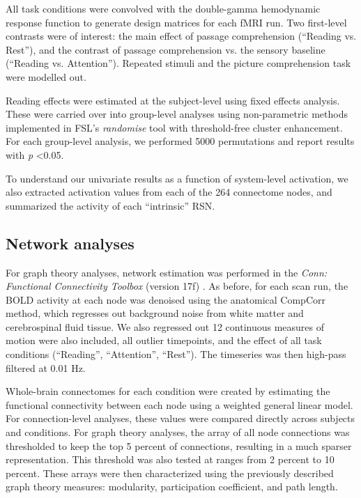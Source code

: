 All task conditions were convolved with the double-gamma hemodynamic response function to generate design matrices for each fMRI run. Two first-level contrasts were of interest: the main effect of passage comprehension (``Reading vs. Rest''), and the contrast of passage comprehension vs. the sensory baseline (``Reading vs. Attention''). Repeated stimuli and the picture comprehension task were modelled out.

Reading effects were estimated at the subject-level using fixed effects analysis. These were carried over into group-level analyses using non-parametric methods implemented in FSL’s \textit{randomise} tool with threshold-free cluster enhancement. For each group-level analysis, we performed 5000 permutations and report results with \textit{p} \textless 0.05. 

To understand our univariate results as a function of system-level activation, we also extracted activation values from each of the 264 connectome nodes, and summarized the activity of each ``intrinsic'' RSN.

\subsection{Network analyses}

For graph theory analyses, network estimation was performed in the \textit{Conn: Functional Connectivity Toolbox} (version 17f) \citep{WhitfieldGabrieli2012}. As before, for each scan run, the BOLD activity at each node was denoised using the anatomical CompCorr method, which regresses out background noise from white matter and cerebrospinal fluid tissue. We also regressed out 12 continuous measures of motion were also included, all outlier timepoints, and the effect of all task conditions (``Reading'', ``Attention'', ``Rest''). The timeseries was then high-pass filtered at 0.01 Hz.

Whole-brain connectomes for each condition were created by estimating the functional connectivity between each node using a weighted general linear model. For connection-level analyses, these values were compared directly across subjects and conditions. For graph theory analyses, the array of all node connections was thresholded to keep the top 5 percent of connections, resulting in a much sparser representation. This threshold was also tested at ranges from 2 percent to 10 percent. These arrays were then characterized using the previously described graph theory measures: modularity, participation coefficient, and path length.


